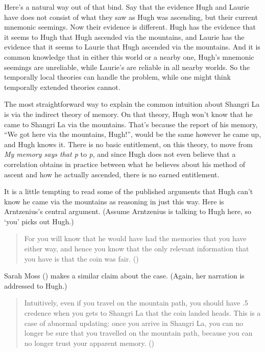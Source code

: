\documentclass[
  10pt,
  letterpaper,
  DIV=11,
  numbers=noendperiod,
  twoside]{scrartcl}
\begin{document}
Here's a natural way out of that bind. Say that the evidence Hugh and
Laurie have does not consist of what they saw as Hugh was ascending, but
their current mnemonic seemings. Now their evidence is different. Hugh
has the evidence that it seems to Hugh that Hugh ascended via the
mountains, and Laurie has the evidence that it seems to Laurie that Hugh
ascended via the mountains. And it is common knowledge that in either
this world or a nearby one, Hugh's mnemonic seemings are unreliable,
while Laurie's are reliable in all nearby worlds. So the temporally
local theories can handle the problem, while one might think temporally
extended theories cannot.

The most straightforward way to explain the common intuition about
Shangri La is via the indirect theory of memory. On that theory, Hugh
won't know that he came to Shangri La via the mountains. That's because
the report of his memory, ``We got here via the mountains, Hugh!'',
would be the same however he came up, and Hugh knows it. There is no
basic entitlement, on this theory, to move from \emph{My memory says
that p} to \emph{p}, and since Hugh does not even believe that a
correlation obtains in practice between what he believes about his
method of ascent and how he actually ascended, there is no earned
entitlement.

It is a little tempting to read some of the published arguments that
Hugh can't know he came via the mountains as reasoning in just this way.
Here is Arntzenius's central argument. (Assume Arntzenius is talking to
Hugh here, so `you' picks out Hugh.)

\begin{quote}
For you will know that he would have had the memories that you have
either way, and hence you know that the only relevant information that
you have is that the coin was fair.
()
\end{quote}

Sarah Moss () makes a similar claim about
the case. (Again, her narration is addressed to Hugh.)

\begin{quote}
Intuitively, even if you travel on the mountain path, you should have .5
credence when you gets to Shangri La that the coin landed heads. This is
a case of abnormal updating: once you arrive in Shangri La, you can no
longer be sure that you travelled on the mountain path, because you can
no longer trust your apparent memory. ()
\end{quote}
\end{document}
